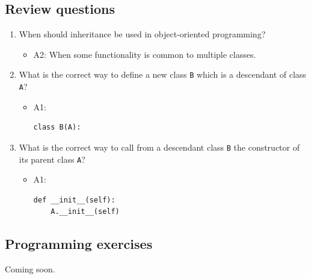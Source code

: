 \documentclass[article,A4,12pt]{llncs}
\begin{document}
\subsection{Review questions}

\begin{enumerate}
\item When should inheritance be used in object-oriented programming?
  \begin{itemize}
    \item A2: When some functionality is common to multiple classes.
  \end{itemize}
\item What is the correct way to define a new class {\tt B} which is a descendant of 
      class {\tt A}?
  \begin{itemize}
    \item A1:
\begin{verbatim}
class B(A):
\end{verbatim}
  \end{itemize}
\item What is the correct way to call from a descendant class {\tt B} the constructor of its parent class 
      {\tt A}?
  \begin{itemize}
    \item A1:
\begin{verbatim}
def __init__(self):
    A.__init__(self)
\end{verbatim}
  \end{itemize}
\end{enumerate}



\subsection{Programming exercises}

Coming soon.
\end{document}
